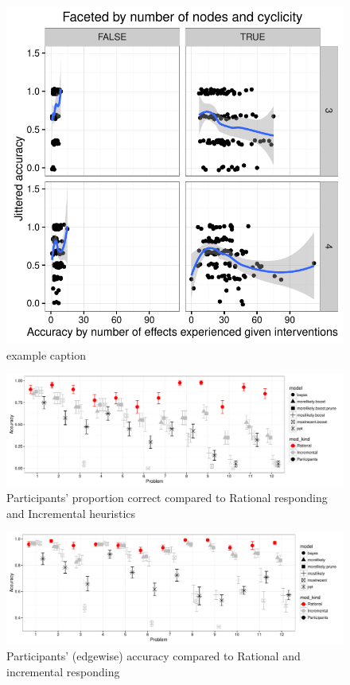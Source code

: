 \documentclass[12pt]{article}
\begin{document}
\begin{figure}[H]
   \centering
   \includegraphics[width = .5\columnwidth]{n_effects_accuracy_relationship}
   \caption{example caption}
   \label{fig:n_effects_accuracy_relationship}
\end{figure}

\begin{figure}[h]
   \centering
   \includegraphics[width = \columnwidth]{ppt_mod_pcorrect_trial}
   \caption{Participants' proportion correct compared to Rational responding and Incremental heuristics}
   \label{fig:ppt_mod_pcorrect_trial}
\end{figure}

\begin{figure}[h]
   \centering
   \includegraphics[width = \columnwidth]{ppt_mod_performance_trial.pdf}
   \caption{Participants' (edgewise) accuracy compared to Rational and incremental responding}
   \label{fig:ppt_mod_performance_trial.pdf}
\end{figure}
\end{document}
